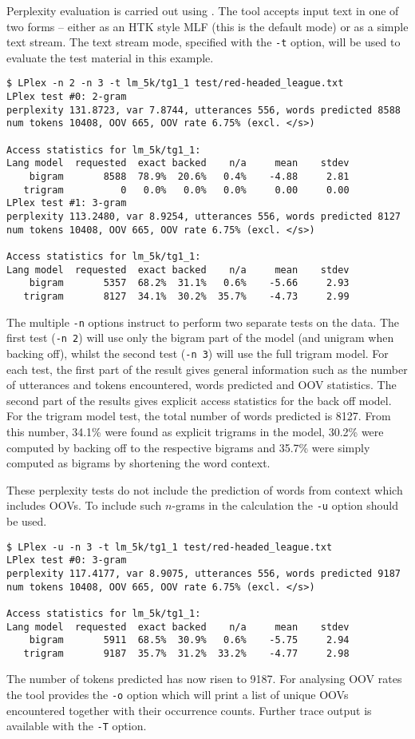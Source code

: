 Perplexity evaluation is carried out using . The tool
accepts input text in one of two forms -- either as an HTK style MLF
(this is the default mode) or as a simple text stream. The text stream
mode, specified with the \texttt{-t} option, will be used to evaluate
the test material in this example.

\begin{verbatim}
$ LPlex -n 2 -n 3 -t lm_5k/tg1_1 test/red-headed_league.txt 
LPlex test #0: 2-gram
perplexity 131.8723, var 7.8744, utterances 556, words predicted 8588
num tokens 10408, OOV 665, OOV rate 6.75% (excl. </s>)

Access statistics for lm_5k/tg1_1:
Lang model  requested  exact backed    n/a     mean    stdev
    bigram       8588  78.9%  20.6%   0.4%    -4.88     2.81
   trigram          0   0.0%   0.0%   0.0%     0.00     0.00
LPlex test #1: 3-gram
perplexity 113.2480, var 8.9254, utterances 556, words predicted 8127
num tokens 10408, OOV 665, OOV rate 6.75% (excl. </s>)

Access statistics for lm_5k/tg1_1:
Lang model  requested  exact backed    n/a     mean    stdev
    bigram       5357  68.2%  31.1%   0.6%    -5.66     2.93
   trigram       8127  34.1%  30.2%  35.7%    -4.73     2.99
\end{verbatim} %
The multiple \texttt{-n} options instruct  to perform two
separate tests on the data. The first test (\texttt{-n 2}) will use
only the bigram part of the model (and unigram when backing off),
whilst the second test (\texttt{-n 3}) will use the full trigram
model. For each test, the first part of the result gives general
information such as the number of utterances and tokens encountered,
words predicted and OOV statistics.  The second part of the results
gives explicit access statistics for the back off model.  For the
trigram model test, the total number of words predicted is 8127. From
this number, 34.1\% were found as explicit trigrams in the model, 30.2\%
were computed by backing off to the respective bigrams and 35.7\% were
simply computed as bigrams by shortening the word context.

These perplexity tests do not include the prediction of words from
context which includes OOVs. To include such $n$-grams in the 
calculation the \texttt{-u} option should be used.
\begin{verbatim}
$ LPlex -u -n 3 -t lm_5k/tg1_1 test/red-headed_league.txt 
LPlex test #0: 3-gram
perplexity 117.4177, var 8.9075, utterances 556, words predicted 9187
num tokens 10408, OOV 665, OOV rate 6.75% (excl. </s>)

Access statistics for lm_5k/tg1_1:
Lang model  requested  exact backed    n/a     mean    stdev
    bigram       5911  68.5%  30.9%   0.6%    -5.75     2.94
   trigram       9187  35.7%  31.2%  33.2%    -4.77     2.98
\end{verbatim} %
The number of tokens predicted has now risen to 9187.  For analysing
OOV rates the tool provides the \texttt{-o} option which will print a
list of unique OOVs encountered together with their occurrence counts.
Further trace output is available with the
\texttt{-T} option.


